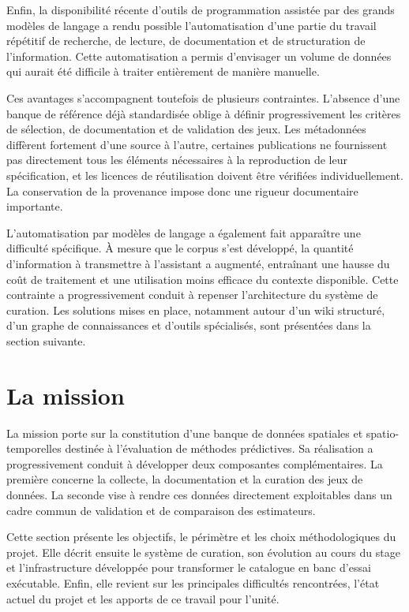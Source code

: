 \documentclass[11pt,a4paper]{article}
\begin{document}
Enfin, la disponibilité récente d'outils de programmation assistée par des grands modèles de langage a rendu possible l'automatisation d'une partie du travail répétitif de recherche, de lecture, de documentation et de structuration de l'information. Cette automatisation a permis d'envisager un volume de données qui aurait été difficile à traiter entièrement de manière manuelle.

Ces avantages s'accompagnent toutefois de plusieurs contraintes. L'absence d'une banque de référence déjà standardisée oblige à définir progressivement les critères de sélection, de documentation et de validation des jeux. Les métadonnées diffèrent fortement d'une source à l'autre, certaines publications ne fournissent pas directement tous les éléments nécessaires à la reproduction de leur spécification, et les licences de réutilisation doivent être vérifiées individuellement. La conservation de la provenance impose donc une rigueur documentaire importante.

L'automatisation par modèles de langage a également fait apparaître une difficulté spécifique. À mesure que le corpus s'est développé, la quantité d'information à transmettre à l'assistant a augmenté, entraînant une hausse du coût de traitement et une utilisation moins efficace du contexte disponible. Cette contrainte a progressivement conduit à repenser l'architecture du système de curation. Les solutions mises en place, notamment autour d'un wiki structuré, d'un graphe de connaissances et d'outils spécialisés, sont présentées dans la section suivante.

\section{La mission}

La mission porte sur la constitution d'une banque de données spatiales et spatio-temporelles destinée à l'évaluation de méthodes prédictives. Sa réalisation a progressivement conduit à développer deux composantes complémentaires. La première concerne la collecte, la documentation et la curation des jeux de données. La seconde vise à rendre ces données directement exploitables dans un cadre commun de validation et de comparaison des estimateurs.

Cette section présente les objectifs, le périmètre et les choix méthodologiques du projet. Elle décrit ensuite le système de curation, son évolution au cours du stage et l'infrastructure développée pour transformer le catalogue en banc d'essai exécutable. Enfin, elle revient sur les principales difficultés rencontrées, l'état actuel du projet et les apports de ce travail pour l'unité.
\end{document}
